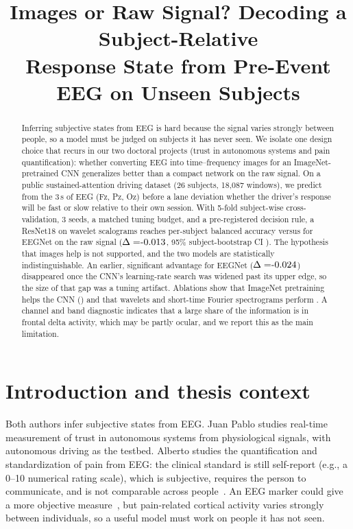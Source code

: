 \documentclass[conference]{IEEEtran}
\begin{document}
\title{Images or Raw Signal? Decoding a Subject-Relative\\ Response State from Pre-Event EEG on Unseen Subjects}

\author{
}

\maketitle

\begin{abstract}
Inferring subjective states from EEG is hard because the signal varies strongly between people, so a model must be judged on subjects it has never seen. We isolate one design choice that recurs in our two doctoral projects (trust in autonomous systems and pain quantification): whether converting EEG into time--frequency images for an ImageNet-pretrained CNN generalizes better than a compact network on the raw signal. On a public sustained-attention driving dataset (26 subjects, 18{,}087 windows), we predict from the 3\,s of EEG (Fz, Pz, Oz) before a lane deviation whether the driver's response will be fast or slow relative to their own session. With 5-fold subject-wise cross-validation, 3 seeds, a matched tuning budget, and a pre-registered decision rule, a ResNet18 on wavelet scalograms reaches \resMainSubj{} per-subject balanced accuracy versus \eegMainSubj{} for EEGNet on the raw signal ($\Delta=\deltaMain$, 95\% subject-bootstrap CI \ciMain). The hypothesis that images help is not supported, and the two models are statistically indistinguishable. An earlier, significant advantage for EEGNet ($\Delta=\deltaOldLr$) disappeared once the CNN's learning-rate search was widened past its upper edge, so the size of that gap was a tuning artifact. Ablations show that ImageNet pretraining helps the CNN (\deltaScratch) and that wavelets and short-time Fourier spectrograms perform \stftVerdict{}. A channel and band diagnostic indicates that a large share of the information is in frontal delta activity, which may be partly ocular, and we report this as the main limitation.
\end{abstract}

\section{Introduction and thesis context}
Both authors infer subjective states from EEG. Juan Pablo studies real-time measurement of trust in autonomous systems from physiological signals, with autonomous driving as the testbed. Alberto studies the quantification and standardization of pain from EEG: the clinical standard is still self-report (e.g., a 0--10 numerical rating scale), which is subjective, requires the person to communicate, and is not comparable across people~\cite{davis2017}. An EEG marker could give a more objective measure~\cite{ploner2018}, but pain-related cortical activity varies strongly between individuals, so a useful model must work on people it has not seen.
\end{document}
